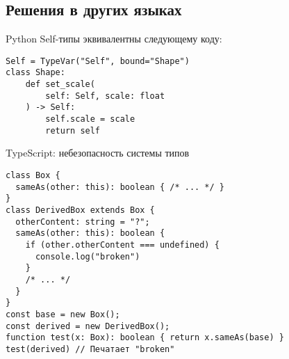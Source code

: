 \documentclass[handout,aspectratio=169,usenames,dvipsnames]{beamer}
\begin{document}
    \subsection{Решения в других языках}

    \begin{frame}[fragile]{Python}
        Self-типы эквивалентны следующему коду:
        \begin{verbatim}
Self = TypeVar("Self", bound="Shape")
class Shape:
    def set_scale(
        self: Self, scale: float
    ) -> Self:
        self.scale = scale
        return self
        \end{verbatim}
    \end{frame}

    \begin{frame}[fragile]{TypeScript: небезопасность системы типов}
        \begin{verbatim}
class Box {
  sameAs(other: this): boolean { /* ... */ }
}
class DerivedBox extends Box {
  otherContent: string = "?";
  sameAs(other: this): boolean {
    if (other.otherContent === undefined) {
      console.log("broken")
    }
    /* ... */
  }
}
const base = new Box();
const derived = new DerivedBox();
function test(x: Box): boolean { return x.sameAs(base) }
test(derived) // Печатает "broken"
        \end{verbatim}
    \end{frame}
\end{document}
